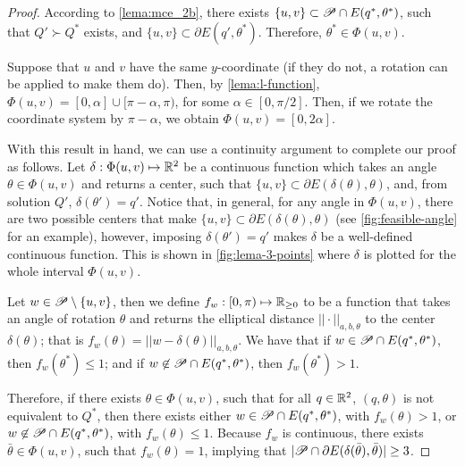 \begin{proof}
	According to \autoref{lema:mce_2b}, there exists $\{u, v\} \subset \mathscr{P} \cap E(q^*, \theta^*)$, such that $Q' \succ Q^*$ exists, and $\{u, v\} \subset \partial E(q', \theta^*)$. Therefore, $\theta^*\in\Phi(u,v)$.
	
	Suppose that $u$ and $v$ have the same $y$-coordinate (if they do not, a rotation can be applied to make them do). Then, by \autoref{lema:l-function}, $\Phi(u,v)=[0, \alpha] \cup [\pi-\alpha, \pi)$, for some $\alpha \in [0, \pi/2]$. Then, if we rotate the coordinate system by $\pi-\alpha$, we obtain $\Phi(u,v)=[0, 2\alpha]$.
	
	With this result in hand, we can use a continuity argument to complete our proof as follows.
	Let $\delta : \Phi(u,v) \mapsto \mathbb{R}^2$ be a continuous function which takes an angle $\theta\in\Phi(u,v)$ and returns a center, such that $\{u,v\} \subset \partial E(\delta(\theta), \theta)$, and, from solution $Q'$, $\delta(\theta') = q'$. Notice that, in general, for any angle in $\Phi(u,v)$, there are two possible centers that make $\{u,v\} \subset \partial E(\delta(\theta), \theta)$ (see \autoref{fig:feasible-angle} for an example), however, imposing $\delta(\theta') = q'$ makes $\delta$ be a well-defined continuous function. This is shown in \autoref{fig:lema-3-points} where $\delta$ is plotted for the whole interval $\Phi(u,v)$.
	
	Let $w\in \mathscr{P} \setminus \{u,v\}$, then we define $f_w  : [0, \pi) \mapsto \mathbb{R}_{\ge0}$ to be a function that takes an angle of rotation $\theta$ and returns the elliptical distance $||\cdot||_{a,b,\theta}$ to the center $\delta(\theta)$; that is $f_w(\theta)=||w-\delta(\theta)||_{a,b,\theta}$.
	We have that if $w \in \mathscr{P} \cap E(q^*, \theta^*)$, then $f_w(\theta^*) \le 1$; and if $w \not\in \mathscr{P} \cap E(q^*, \theta^*)$, then $f_w(\theta^*) > 1$.
	
	Therefore, if there exists $\theta\in\Phi(u,v)$, such that for all $q\in\mathbb{R}^2$, $(q, \theta)$ is not equivalent to $Q^*$, then there exists either $w \in \mathscr{P} \cap E(q^*, \theta^*)$, with $f_w(\theta)>1$, or $w \not\in \mathscr{P} \cap E(q^*, \theta^*)$, with $f_w(\theta)\le 1$. Because $f_w$ is continuous, there exists $\bar{\theta}\in\Phi(u,v)$, such that $f_w(\theta)=1$, implying that $|\mathscr{P} \cap \partial E(\delta(\bar{\theta}), \bar{\theta})| \ge 3$.
\end{proof}


